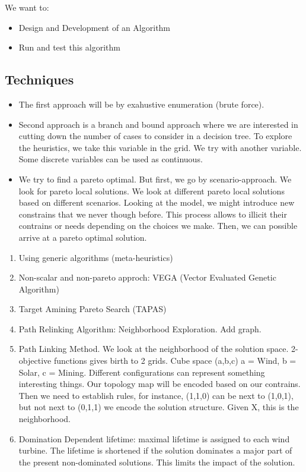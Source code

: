 \documentclass[12pt]{article}
\begin{document}
We want to:
\begin{itemize}
\item Design and Development of an Algorithm
\item Run and test this algorithm
\end{itemize}

\subsection{Techniques}

\begin{itemize}
\item The first approach will be by exahustive enumeration (brute force). 
\item Second approach is a branch and bound approach where we are interested in cutting down the number of cases to consider in a decision tree. To explore the heuristics, we take this variable in the grid. We try with another variable. Some discrete variables can be used as continuous. 
\item We try to find a pareto optimal. But first, we go by scenario-approach. We look for pareto local solutions. We look at different pareto local solutions based on different scenarios. Looking at the model, we might introduce new constrains that we never though before. This process allows to illicit their contrains or needs depending on the choices we make. Then, we can possible arrive at a pareto optimal solution. 
\end{itemize}

\begin{enumerate}
\item Using generic algorithms (meta-heuristics)
\item Non-scalar and non-pareto approch: VEGA (Vector Evaluated Genetic Algorithm)
\item Target Amining Pareto Search (TAPAS)
\item Path Relinking Algorithm: Neighborhood Exploration. Add graph.
\item  Path Linking Method. We look at the neighborhood of the solution space. 2-objective functions gives birth to 2 grids. Cube space (a,b,c) a = Wind, b = Solar, c = Mining. Different configurations can represent something interesting things. Our topology map will be encoded based on our contrains. Then we need to establish rules, for instance, (1,1,0) can be next to (1,0,1), but not next to (0,1,1) we encode the solution structure. Given X, this is the neighborhood.  
\item Domination Dependent lifetime: maximal lifetime is assigned to each wind turbine. The lifetime is shortened if the solution dominates a major part of the present non-dominated solutions. This limits the impact of the solution. 
\end{enumerate}
\end{document}

